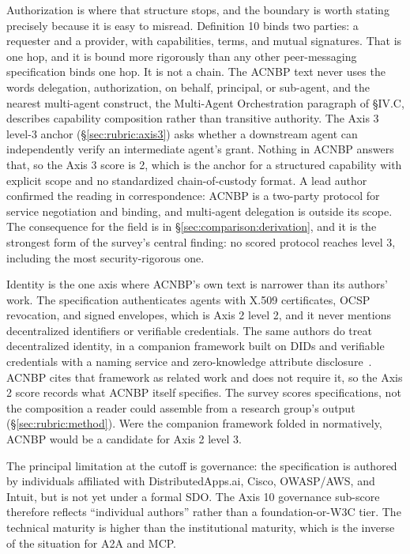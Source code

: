 Authorization is where that structure stops, and the
boundary is worth stating precisely because it is easy to
misread. Definition 10 binds two parties: a requester and
a provider, with capabilities, terms, and mutual
signatures. That is one hop, and it is bound more
rigorously than any other peer-messaging specification
binds one hop. It is not a chain. The ACNBP text never
uses the words delegation, authorization, on behalf,
principal, or sub-agent, and the nearest multi-agent
construct, the Multi-Agent Orchestration paragraph of
\S IV.C, describes capability composition rather than
transitive authority. The Axis 3 level-3 anchor
(\S\ref{sec:rubric:axis3}) asks whether a downstream
agent can independently verify an intermediate agent's
grant. Nothing in ACNBP answers that, so the Axis 3
score is 2, which is the anchor for a structured
capability with explicit scope and no standardized
chain-of-custody format. A lead author
confirmed the reading in correspondence: ACNBP is a
two-party protocol for service negotiation and binding,
and multi-agent delegation is outside its scope. The
consequence for the field is in
\S\ref{sec:comparison:derivation}, and it is the
strongest form of the survey's central finding: no
scored protocol reaches level 3, including the most
security-rigorous one.

Identity is the one axis where ACNBP's own text is
narrower than its authors' work. The specification
authenticates agents with X.509 certificates, OCSP
revocation, and signed envelopes, which is Axis 2 level 2,
and it never mentions decentralized identifiers or
verifiable credentials. The same authors do treat
decentralized identity, in a companion framework built on
DIDs and verifiable credentials with a naming service and
zero-knowledge attribute
disclosure~\cite{huang_zerotrust_identity}. ACNBP cites
that framework as related work and does not require it, so
the Axis 2 score records what ACNBP itself specifies. The
survey scores specifications, not the composition a reader
could assemble from a research group's output
(\S\ref{sec:rubric:method}). Were the companion framework
folded in normatively, ACNBP would be a candidate for
Axis 2 level 3.

The principal limitation at the cutoff is governance: the
specification is authored by individuals affiliated with
DistributedApps.ai, Cisco, OWASP/AWS, and Intuit, but is
not yet under a formal SDO. The Axis 10 governance
sub-score therefore reflects ``individual authors''
rather than a foundation-or-W3C tier. The technical
maturity is higher than the institutional maturity, which
is the inverse of the situation for A2A and MCP.

